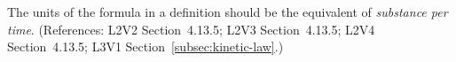 The units of the  formula in a \KineticLaw definition should be
the equivalent of \emph{substance per time}.  (References: L2V2
Section~4.13.5; L2V3 Section~4.13.5; L2V4 Section~4.13.5; L3V1 Section~\ref{subsec:kinetic-law}.)
